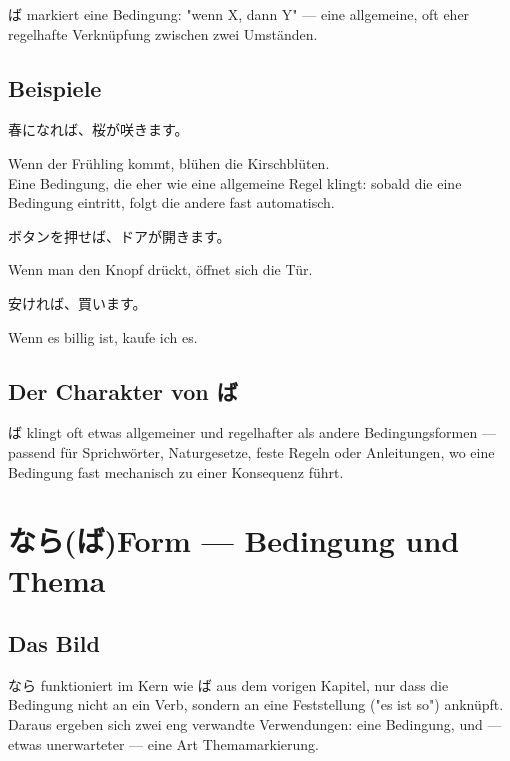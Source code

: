 \documentclass[12pt]{book}
\begin{document}
ば markiert eine Bedingung: "wenn X, dann Y" — eine allgemeine, oft eher regelhafte Verknüpfung zwischen zwei Umständen.

\section*{Beispiele}

\par\quad 春になれば、桜が咲きます。\\
\par\quad Wenn der Frühling kommt, blühen die Kirschblüten.\\

Eine Bedingung, die eher wie eine allgemeine Regel klingt: sobald die eine Bedingung eintritt, folgt die andere fast automatisch.

\par\quad ボタンを押せば、ドアが開きます。\\
\par\quad Wenn man den Knopf drückt, öffnet sich die Tür.\\

\par\quad 安ければ、買います。\\
\par\quad Wenn es billig ist, kaufe ich es.\\

\section*{Der Charakter von ば}

ば klingt oft etwas allgemeiner und regelhafter als andere Bedingungsformen — passend für Sprichwörter, Naturgesetze, feste Regeln oder Anleitungen, wo eine Bedingung fast mechanisch zu einer Konsequenz führt.


\chapter{なら(ば)Form — Bedingung und Thema}

\section*{Das Bild}

なら funktioniert im Kern wie ば aus dem vorigen Kapitel, nur dass die Bedingung nicht an ein Verb, sondern an eine Feststellung ("es ist so") anknüpft. Daraus ergeben sich zwei eng verwandte Verwendungen: eine Bedingung, und — etwas unerwarteter — eine Art Themamarkierung.
\end{document}
